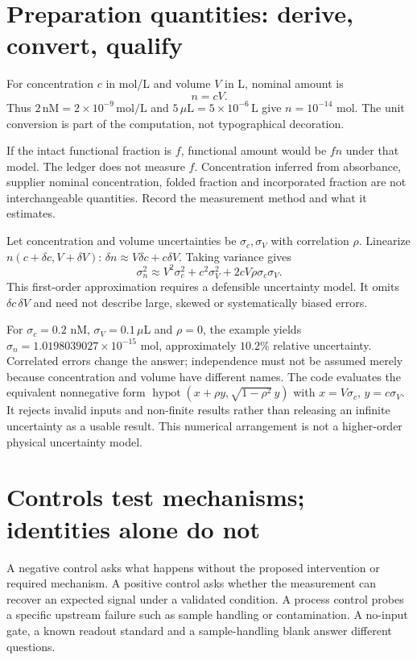 \section{Preparation quantities: derive, convert, qualify}
For concentration $c$ in mol/L and volume $V$ in L, nominal amount is
\begin{equation}
n=cV.
\label{dnad26:amount}
\end{equation}
Thus $2\,\mathrm{nM}=2\times10^{-9}\,\mathrm{mol/L}$ and
$5\,\mu\mathrm L=5\times10^{-6}\,\mathrm L$ give $n=10^{-14}$ mol.
The unit conversion is part of the computation, not typographical decoration.

If the intact functional fraction is $f$, functional amount would be $fn$ under
that model. The ledger does not measure $f$. Concentration inferred from absorbance,
supplier nominal concentration, folded fraction and incorporated fraction are not
interchangeable quantities. Record the measurement method and what it estimates.

Let concentration and volume uncertainties be $\sigma_c,\sigma_V$ with correlation
$\rho$. Linearize $n(c+\delta c,V+\delta V)$:
$\delta n\approx V\delta c+c\delta V$. Taking variance gives
\begin{equation}
\sigma_n^2\approx V^2\sigma_c^2+c^2\sigma_V^2+
2cV\rho\sigma_c\sigma_V.
\label{dnad26:uncertainty}
\end{equation}
This first-order approximation requires a defensible uncertainty model.
It omits $\delta c\,\delta V$ and need not describe
large, skewed or systematically biased errors.

For $\sigma_c=0.2$ nM, $\sigma_V=0.1\,\mu$L and $\rho=0$, the example yields
$\sigma_n=1.0198039027\times10^{-15}$ mol, approximately $10.2\%$ relative
uncertainty. Correlated errors change the answer; independence must not be assumed
merely because concentration and volume have different names.
The code evaluates the equivalent nonnegative form
$\operatorname{hypot}(x+\rho y,\sqrt{1-\rho^2}\,y)$ with $x=V\sigma_c$,
$y=c\sigma_V$. It rejects invalid inputs and non-finite results rather than releasing
an infinite uncertainty as a usable result. This numerical arrangement is not
a higher-order physical uncertainty model.

\section{Controls test mechanisms; identities alone do not}
A negative control asks what happens without the proposed intervention or required
mechanism. A positive control asks whether the measurement can recover an expected
signal under a validated condition. A process control probes a specific upstream
failure such as sample handling or contamination. A no-input gate, a known readout
standard and a sample-handling blank answer different questions.

